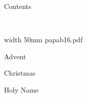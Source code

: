 \eject

\centerline{\bigtype Contents}

\doubleline

\bigskip

\readtocfile

\vfill

\eject

\vfill
\eject


%






\ 

\vfill


\pdfximage width 50mm {papab16.pdf}

\centerline{\pdfrefximage \pdflastximage}



\vfill



\eject


\beginpart Advent



\paginaproxima


\bigskip


\paginaproxima

\beginpart Christmas


\paginaproxima


\paginaproxima


\paginaproxima

\beginpart Holy Name


\bigskip



